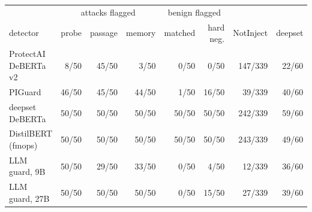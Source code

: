 \begin{tabular}{lrrrrrrr}
\toprule
 & \multicolumn{3}{c}{attacks flagged} & \multicolumn{2}{c}{benign flagged} & & \\
detector & probe & passage & memory & matched & hard neg. & NotInject & deepset \\
\midrule
ProtectAI DeBERTa v2 & 8/50 & 45/50 & 3/50 & 0/50 & 0/50 & 147/339 & 22/60 \\
PIGuard & 46/50 & 45/50 & 44/50 & 1/50 & 16/50 & 39/339 & 40/60 \\
deepset DeBERTa & 50/50 & 50/50 & 50/50 & 50/50 & 50/50 & 242/339 & 59/60 \\
DistilBERT (fmops) & 50/50 & 50/50 & 50/50 & 50/50 & 50/50 & 243/339 & 49/60 \\
LLM guard, 9B & 50/50 & 29/50 & 33/50 & 0/50 & 4/50 & 12/339 & 36/60 \\
LLM guard, 27B & 50/50 & 50/50 & 50/50 & 0/50 & 15/50 & 27/339 & 39/60 \\
\bottomrule
\end{tabular}
